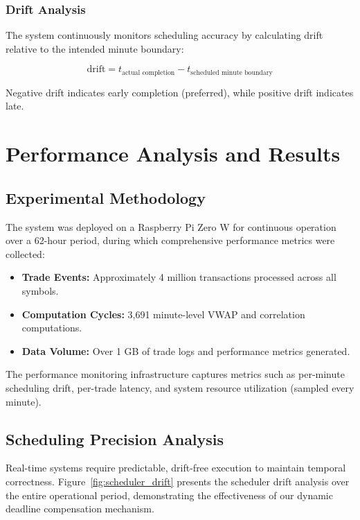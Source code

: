 \documentclass[12pt,a4paper]{article}
\begin{document}
\subsubsection{Drift Analysis}

The system continuously monitors scheduling accuracy by calculating drift relative to the intended minute boundary:

\[
\text{drift} = t_{\text{actual completion}} - t_{\text{scheduled minute boundary}}
\]

Negative drift indicates early completion (preferred), while positive drift indicates late.

\section{Performance Analysis and Results}

\subsection{Experimental Methodology}

The system was deployed on a Raspberry Pi Zero W for continuous operation over a 62-hour period, during which comprehensive performance metrics were collected:

\begin{itemize}
    \item \textbf{Trade Events:} Approximately 4 million transactions processed across all symbols.
    \item \textbf{Computation Cycles:} 3,691 minute-level VWAP and correlation computations.
    \item \textbf{Data Volume:} Over 1 GB of trade logs and performance metrics generated.
\end{itemize}

The performance monitoring infrastructure captures metrics such as per-minute scheduling drift, per-trade latency, and system resource utilization (sampled every minute).

\subsection{Scheduling Precision Analysis}

Real-time systems require predictable, drift-free execution to maintain temporal correctness. Figure~\ref{fig:scheduler_drift} presents the scheduler drift analysis over the entire operational period, demonstrating the effectiveness of our dynamic deadline compensation mechanism.
\end{document}

